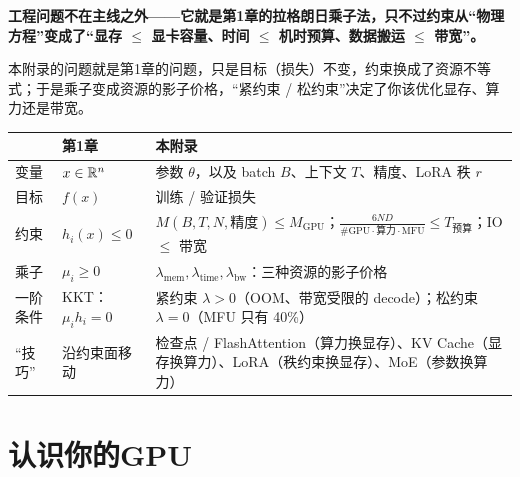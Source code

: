 \begin{tcolorbox}[colback=yellow!10, colframe=orange!80, title=本附录的核心观点]
\textbf{工程问题不在主线之外——它就是第1章的拉格朗日乘子法，只不过约束从“物理方程”变成了“显存 $\le$ 显卡容量、时间 $\le$ 机时预算、数据搬运 $\le$ 带宽”。}

本附录的问题就是第1章的问题，只是目标（损失）不变，约束换成了资源不等式；于是乘子变成资源的影子价格，“紧约束 / 松约束”决定了你该优化显存、算力还是带宽。

\begin{center}
\renewcommand{\arraystretch}{1.3}
\small
\begin{tabular}{@{}p{1.2cm}p{2.6cm}p{7.2cm}@{}}
\toprule
 & \textbf{第1章} & \textbf{本附录} \\
\midrule
变量 & $x \in \mathbb{R}^n$ & 参数 $\theta$，以及 batch $B$、上下文 $T$、精度、LoRA 秩 $r$ \\
目标 & $f(x)$ & 训练 / 验证损失 \\
约束 & $h_i(x) \le 0$ & $M(B, T, N, \text{精度}) \le M_{\text{GPU}}$；$\frac{6ND}{\#\text{GPU} \cdot \text{算力} \cdot \text{MFU}} \le T_{\text{预算}}$；IO $\le$ 带宽 \\
乘子 & $\mu_i \ge 0$ & $\lambda_{\text{mem}}, \lambda_{\text{time}}, \lambda_{\text{bw}}$：三种资源的影子价格 \\
一阶条件 & KKT：$\mu_i h_i = 0$ & 紧约束 $\lambda > 0$（OOM、带宽受限的 decode）；松约束 $\lambda = 0$（MFU 只有 40\%） \\
“技巧” & 沿约束面移动 & 检查点 / FlashAttention（算力换显存）、KV Cache（显存换算力）、LoRA（秩约束换显存）、MoE（参数换算力） \\
\bottomrule
\end{tabular}
\end{center}
\end{tcolorbox}

\section*{认识你的GPU}


